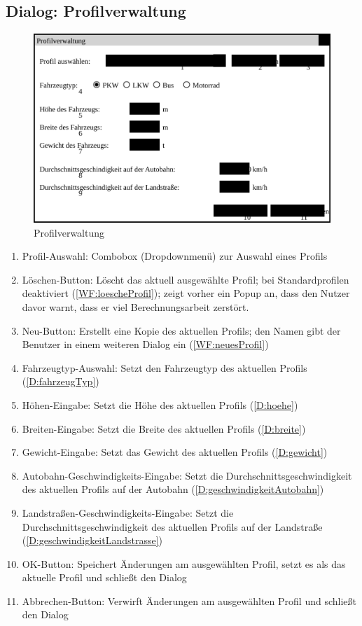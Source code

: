 \documentclass[a4paper, 11pt]{article}
\begin{document}
\subsection{Dialog: Profilverwaltung}
\begin{figure}[H]
\centering
\includegraphics[width=0.7\linewidth]{Profilverwaltung}
\caption{Profilverwaltung}
\label{fig:mockupprofilverwaltung}
\end{figure}
\begin{enumerate}
\item Profil-Auswahl: Combobox (Dropdownmenü) zur Auswahl eines Profils
\item Löschen-Button: Löscht das aktuell ausgewählte Profil; bei Standardprofilen deaktiviert (\ref{WF:loescheProfil}); zeigt vorher ein Popup an, dass den Nutzer davor warnt, dass er viel Berechnungsarbeit zerstört. 
\item Neu-Button: Erstellt eine Kopie des aktuellen Profils; den Namen gibt der Benutzer in einem weiteren Dialog ein (\ref{WF:neuesProfil})
\item Fahrzeugtyp-Auswahl: Setzt den Fahrzeugtyp des aktuellen Profils (\ref{D:fahrzeugTyp})
\item Höhen-Eingabe: Setzt die Höhe des aktuellen Profils (\ref{D:hoehe})
\item Breiten-Eingabe: Setzt die Breite des aktuellen Profils (\ref{D:breite})
\item Gewicht-Eingabe: Setzt das Gewicht des aktuellen Profils (\ref{D:gewicht})
\item Autobahn-Geschwindigkeits-Eingabe: Setzt die Durchschnittsgeschwindigkeit des aktuellen Profils auf der Autobahn (\ref{D:geschwindigkeitAutobahn})
\item Landstraßen-Geschwindigkeits-Eingabe: Setzt die Durchschnittsgeschwindigkeit des aktuellen Profils auf der Landstraße (\ref{D:geschwindigkeitLandstrasse})
\item OK-Button: Speichert Änderungen am ausgewählten Profil, setzt es als das aktuelle Profil und schließt den Dialog
\item Abbrechen-Button: Verwirft Änderungen am ausgewählten Profil und schließt den Dialog
\end{enumerate}
\end{document}
